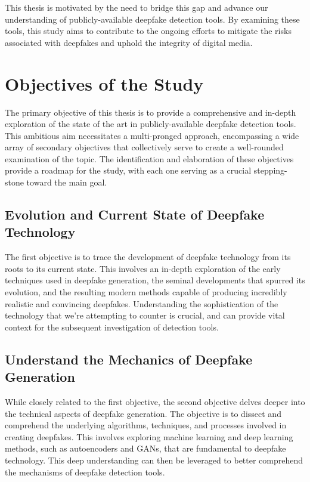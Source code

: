 This thesis is motivated by the need to bridge this gap and advance our understanding of
publicly-available deepfake detection tools. By examining these tools, this study aims to
contribute to the ongoing efforts to mitigate the risks associated with deepfakes and uphold
the integrity of digital media.


\section{Objectives of the Study}\label{chapter:objectives}
The primary objective of this thesis is to provide a comprehensive and in-depth exploration 
of the state of the art in publicly-available deepfake detection tools. This ambitious aim 
necessitates a multi-pronged approach, encompassing a wide array of secondary objectives 
that collectively serve to create a well-rounded examination of the topic. The identification 
and elaboration of these objectives provide a roadmap for the study, with each one serving 
as a crucial stepping-stone toward the main goal.

\subsection{Evolution and Current State of Deepfake Technology}
The first objective is to trace the development of deepfake technology from its roots to its 
current state. This involves an in-depth exploration of the early techniques used in deepfake 
generation, the seminal developments that spurred its evolution, and the resulting modern 
methods capable of producing incredibly realistic and convincing deepfakes. Understanding the 
sophistication of the technology that we're attempting to counter is crucial, and can provide 
vital context for the subsequent investigation of detection tools.

\subsection{Understand the Mechanics of Deepfake Generation}
While closely related to the first objective, the second objective delves deeper into the 
technical aspects of deepfake generation. The objective is to dissect and comprehend the 
underlying algorithms, techniques, and processes involved in creating deepfakes. This involves 
exploring machine learning and deep learning methods, such as autoencoders and 
\ac{GAN}s, that are fundamental to deepfake technology. This deep understanding can 
then be leveraged to better comprehend the mechanisms of deepfake detection tools.

